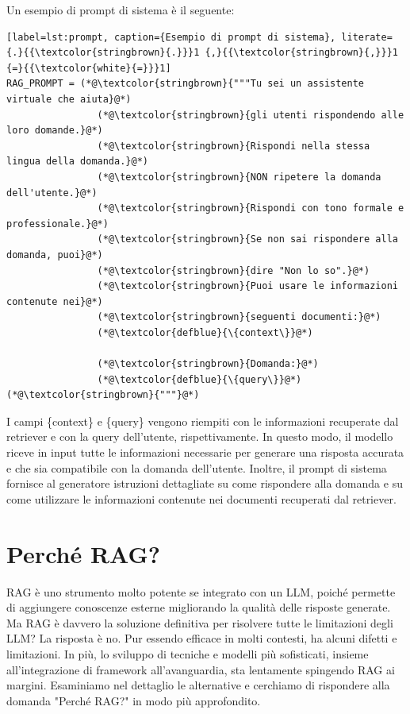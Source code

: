 Un esempio di prompt di sistema è il seguente:
\begin{lstlisting}[label=lst:prompt, caption={Esempio di prompt di sistema}, literate={.}{{\textcolor{stringbrown}{.}}}1 {,}{{\textcolor{stringbrown}{,}}}1 {=}{{\textcolor{white}{=}}}1]
RAG_PROMPT = (*@\textcolor{stringbrown}{"""Tu sei un assistente virtuale che aiuta}@*)
                (*@\textcolor{stringbrown}{gli utenti rispondendo alle loro domande.}@*)
                (*@\textcolor{stringbrown}{Rispondi nella stessa lingua della domanda.}@*)
                (*@\textcolor{stringbrown}{NON ripetere la domanda dell'utente.}@*)
                (*@\textcolor{stringbrown}{Rispondi con tono formale e professionale.}@*)
                (*@\textcolor{stringbrown}{Se non sai rispondere alla domanda, puoi}@*)
                (*@\textcolor{stringbrown}{dire "Non lo so".}@*)
                (*@\textcolor{stringbrown}{Puoi usare le informazioni contenute nei}@*)
                (*@\textcolor{stringbrown}{seguenti documenti:}@*)
                (*@\textcolor{defblue}{\{context\}}@*)
                
                (*@\textcolor{stringbrown}{Domanda:}@*)
                (*@\textcolor{defblue}{\{query\}}@*)(*@\textcolor{stringbrown}{"""}@*)
\end{lstlisting}
I campi \{context\} e \{query\} vengono riempiti con le informazioni recuperate dal retriever e con la query dell'utente, rispettivamente. In questo modo, il modello riceve in input tutte le informazioni necessarie per generare una risposta accurata e che sia compatibile con la domanda dell'utente. Inoltre, il prompt di sistema fornisce al generatore istruzioni dettagliate su come rispondere alla domanda e su come utilizzare le informazioni contenute nei documenti recuperati dal retriever.

\section{Perché RAG?}
RAG è uno strumento molto potente se integrato con un LLM, poiché permette di aggiungere conoscenze esterne migliorando la qualità delle risposte generate. Ma RAG è davvero la soluzione definitiva per risolvere tutte le limitazioni degli LLM? La risposta è no. Pur essendo efficace in molti contesti, ha alcuni difetti e limitazioni. In più, lo sviluppo di tecniche e modelli più sofisticati, insieme all'integrazione di framework all'avanguardia, sta lentamente spingendo RAG ai margini. Esaminiamo nel dettaglio le alternative e cerchiamo di rispondere alla domanda "Perché RAG?" in modo più approfondito.


